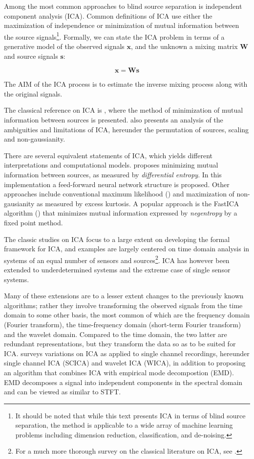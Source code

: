 \documentclass[11pt, oneside, a4paper]{report}
\begin{document}
Among the most common approaches to blind source separation is
independent component analysis (ICA). Common definitions of ICA use
either the maximization of independence or minimization of mutual information between the source
signals\footnote{It should be noted that while this text presents ICA
  in terms of blind source separation, the method is applicable to a
  wide array of machine learning problems including dimension
  reduction, classification, and de-noising.}. Formally, we can state
the ICA problem in terms of a generative model of the observed signals
$\mathbf{x}$, and the unknown a mixing matrix $\mathbf{W}$ and source
signals $\mathbf{s}$:


\begin{equation}
  \mathbf{x} =   \mathbf{W}  \mathbf{s}
\end{equation}

The AIM of the ICA process is to estimate the inverse mixing process
along with the original signals.

The classical reference on ICA
is \cite{comon94}, where the method of minimization of mutual
information between sources is presented. \cite{comon94} also presents an
analysis of the ambiguities and limitations of ICA, hereunder the permutation of
sources, scaling and non-gaussianity. 

There are several equivalent statements of ICA, which yields different
interpretations and computational models.
\cite{bellSejnowski95} proposes minimizing mutual information between
sources, as measured by \emph{differential entropy}. In this
implementation a feed-forward neural network structure is proposed.
Other approaches include conventional maximum likelihood (\cite{pearlmutterParra}) and maximization of
non-gausianity as measured by excess kurtosis. A popular approach is
the  FastICA algorithm (\cite{fastICA}) that minimizes mutual
information expressed by \emph{negentropy} by a fixed point method. 

The classic studies on ICA focus to a large extent on developing the
formal framework for ICA, and examples are largely centered on time
domain analysis in systems of an equal number of sensors and
sources\footnote{For a much more thorough survey on the classical literature 
on ICA, see \cite{hyvarinen2001}.}. ICA has however been extended to underdetermined systems and
the extreme case of single sensor systems. 

Many of these extensions are to a lesser extent changes to the
previously known algorithms; rather they involve transforming
the observed signals from the time domain to some other basis, the
most common of which are the frequency domain (Fourier transform), the
time-frequency domain (short-term Fourier transform) and the wavelet
domain. Compared to the time domain, the two latter are redundant
representations, but they transform the data so as to be suited for
ICA. \cite{mijovic2010} surveys variations on ICA as applied to single
channel recordings, hereunder single channel ICA (SCICA) and wavelet
ICA (WICA), in addition to proposing an algorithm that combines ICA
with empirical mode decompostion (EMD). EMD decomposes a signal into
independent components in the spectral domain and can be viewed as
similar to STFT.
\end{document}
